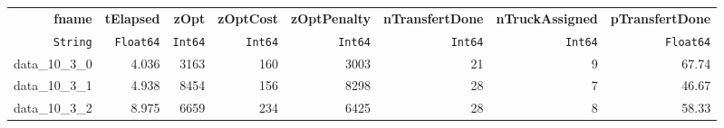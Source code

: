 \begin{tabular}{rrrrrrrr}
  \hline
  \textbf{fname} & \textbf{tElapsed} & \textbf{zOpt} & \textbf{zOptCost} & \textbf{zOptPenalty} & \textbf{nTransfertDone} & \textbf{nTruckAssigned} & \textbf{pTransfertDone} \\
  \texttt{String} & \texttt{Float64} & \texttt{Int64} & \texttt{Int64} & \texttt{Int64} & \texttt{Int64} & \texttt{Int64} & \texttt{Float64} \\\hline
  data\_10\_3\_0 & 4.036 & 3163 & 160 & 3003 & 21 & 9 & 67.74 \\
  data\_10\_3\_1 & 4.938 & 8454 & 156 & 8298 & 28 & 7 & 46.67 \\
  data\_10\_3\_2 & 8.975 & 6659 & 234 & 6425 & 28 & 8 & 58.33 \\\hline
\end{tabular}
